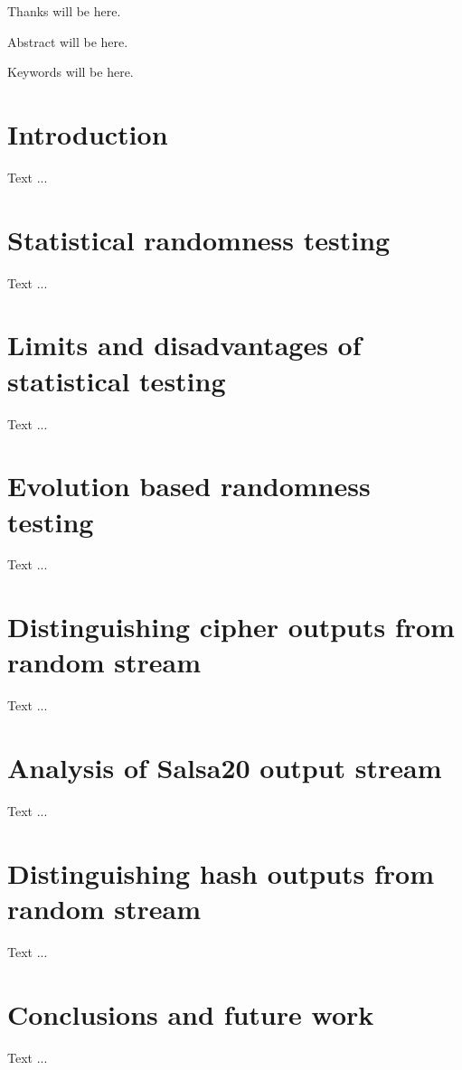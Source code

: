 \documentclass[12pt,oneside]{fithesis2}
\begin{document}
\FrontMatter
\ThesisTitlePage

\begin{ThesisDeclaration}
\DeclarationText
\AdvisorName
\end{ThesisDeclaration}

\begin{ThesisThanks}
Thanks will be here.
\end{ThesisThanks}

\begin{ThesisAbstract}
Abstract will be here.
\end{ThesisAbstract}

\begin{ThesisKeyWords}
Keywords will be here.
\end{ThesisKeyWords}

\MainMatter
\tableofcontents
\chapter{Introduction}
\label{chap:intro}
Text ...

\chapter{Statistical randomness testing}
\label{chap:stat-rand-testing}
Text ...

\chapter{Limits and disadvantages of statistical testing}
\label{chap:limits-stat-testing}
Text ...

\chapter{Evolution based randomness testing}
\label{chap:evo-based-testing}
Text ...

\chapter{Distinguishing cipher outputs from random stream}
\label{chap:distinguish-cipher}
Text ...

\chapter{Analysis of Salsa20 output stream}
\label{chap:analysis-salsa}
Text ...

\chapter{Distinguishing hash outputs from random stream}
\label{chap:distinguish-hash}
Text ...

\chapter{Conclusions and future work}
\label{chap:conclusions}
Text ...
\end{document}
